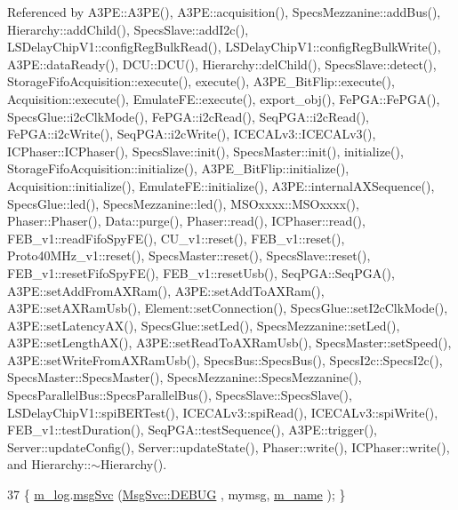 Referenced by A3\+P\+E\+::\+A3\+P\+E(), A3\+P\+E\+::acquisition(), Specs\+Mezzanine\+::add\+Bus(), Hierarchy\+::add\+Child(), Specs\+Slave\+::add\+I2c(), L\+S\+Delay\+Chip\+V1\+::config\+Reg\+Bulk\+Read(), L\+S\+Delay\+Chip\+V1\+::config\+Reg\+Bulk\+Write(), A3\+P\+E\+::data\+Ready(), D\+C\+U\+::\+D\+C\+U(), Hierarchy\+::del\+Child(), Specs\+Slave\+::detect(), Storage\+Fifo\+Acquisition\+::execute(), execute(), A3\+P\+E\+\_\+\+Bit\+Flip\+::execute(), Acquisition\+::execute(), Emulate\+F\+E\+::execute(), export\+\_\+obj(), Fe\+P\+G\+A\+::\+Fe\+P\+G\+A(), Specs\+Glue\+::i2c\+Clk\+Mode(), Fe\+P\+G\+A\+::i2c\+Read(), Seq\+P\+G\+A\+::i2c\+Read(), Fe\+P\+G\+A\+::i2c\+Write(), Seq\+P\+G\+A\+::i2c\+Write(), I\+C\+E\+C\+A\+Lv3\+::\+I\+C\+E\+C\+A\+Lv3(), I\+C\+Phaser\+::\+I\+C\+Phaser(), Specs\+Slave\+::init(), Specs\+Master\+::init(), initialize(), Storage\+Fifo\+Acquisition\+::initialize(), A3\+P\+E\+\_\+\+Bit\+Flip\+::initialize(), Acquisition\+::initialize(), Emulate\+F\+E\+::initialize(), A3\+P\+E\+::internal\+A\+X\+Sequence(), Specs\+Glue\+::led(), Specs\+Mezzanine\+::led(), M\+S\+Oxxxx\+::\+M\+S\+Oxxxx(), Phaser\+::\+Phaser(), Data\+::purge(), Phaser\+::read(), I\+C\+Phaser\+::read(), F\+E\+B\+\_\+v1\+::read\+Fifo\+Spy\+F\+E(), C\+U\+\_\+v1\+::reset(), F\+E\+B\+\_\+v1\+::reset(), Proto40\+M\+Hz\+\_\+v1\+::reset(), Specs\+Master\+::reset(), Specs\+Slave\+::reset(), F\+E\+B\+\_\+v1\+::reset\+Fifo\+Spy\+F\+E(), F\+E\+B\+\_\+v1\+::reset\+Usb(), Seq\+P\+G\+A\+::\+Seq\+P\+G\+A(), A3\+P\+E\+::set\+Add\+From\+A\+X\+Ram(), A3\+P\+E\+::set\+Add\+To\+A\+X\+Ram(), A3\+P\+E\+::set\+A\+X\+Ram\+Usb(), Element\+::set\+Connection(), Specs\+Glue\+::set\+I2c\+Clk\+Mode(), A3\+P\+E\+::set\+Latency\+A\+X(), Specs\+Glue\+::set\+Led(), Specs\+Mezzanine\+::set\+Led(), A3\+P\+E\+::set\+Length\+A\+X(), A3\+P\+E\+::set\+Read\+To\+A\+X\+Ram\+Usb(), Specs\+Master\+::set\+Speed(), A3\+P\+E\+::set\+Write\+From\+A\+X\+Ram\+Usb(), Specs\+Bus\+::\+Specs\+Bus(), Specs\+I2c\+::\+Specs\+I2c(), Specs\+Master\+::\+Specs\+Master(), Specs\+Mezzanine\+::\+Specs\+Mezzanine(), Specs\+Parallel\+Bus\+::\+Specs\+Parallel\+Bus(), Specs\+Slave\+::\+Specs\+Slave(), L\+S\+Delay\+Chip\+V1\+::spi\+B\+E\+R\+Test(), I\+C\+E\+C\+A\+Lv3\+::spi\+Read(), I\+C\+E\+C\+A\+Lv3\+::spi\+Write(), F\+E\+B\+\_\+v1\+::test\+Duration(), Seq\+P\+G\+A\+::test\+Sequence(), A3\+P\+E\+::trigger(), Server\+::update\+Config(), Server\+::update\+State(), Phaser\+::write(), I\+C\+Phaser\+::write(), and Hierarchy\+::$\sim$\+Hierarchy().


\begin{DoxyCode}
37 \{ \hyperlink{classObject_a0d269813dd7ac1f24bc143031e2963f2}{m\_log}.\hyperlink{classMsgSvc_ad25f18047920cc59a314e5098259711c}{msgSvc} (\hyperlink{classMsgSvc_ae671eb7301996cd049d2da8a65925926a1dbdcc82dce88370ec335883c83b38b0}{MsgSvc::DEBUG}   , mymsg, \hyperlink{classObject_a8b83c95c705d2c3ba0d081fe1710f48d}{m\_name} ); \}
\end{DoxyCode}
\mbox{\label{classObject_a6c9a0397ca804e04d675ed05683f5420}} 
